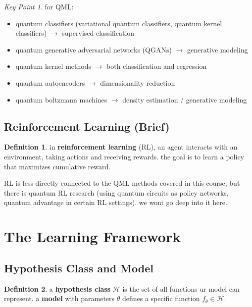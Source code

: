 \documentclass[11pt,a4paper]{article}
\theoremstyle{definition}
\newtheorem{definition}{Definition}[section]
\theoremstyle{remark}
\newtheorem*{keypoint}{Key Point}
\begin{document}
\begin{keypoint}
for QML:
\begin{itemize}
    \item quantum classifiers (variational quantum classifiers, quantum kernel classifiers) $\to$ supervised classification
    \item quantum generative adversarial networks (QGANs) $\to$ generative modeling
    \item quantum kernel methods $\to$ both classification and regression
    \item quantum autoencoders $\to$ dimensionality reduction
    \item quantum boltzmann machines $\to$ density estimation / generative modeling
\end{itemize}
\end{keypoint}

\subsection{Reinforcement Learning (Brief)}

\begin{definition}
in \textbf{reinforcement learning} (RL), an agent interacts with an environment, taking actions and receiving rewards. the goal is to learn a policy that maximizes cumulative reward.
\end{definition}

RL is less directly connected to the QML methods covered in this course, but there is quantum RL research (using quantum circuits as policy networks, quantum advantage in certain RL settings). we wont go deep into it here.

\section{The Learning Framework}

\subsection{Hypothesis Class and Model}

\begin{definition}
a \textbf{hypothesis class} $\mathcal{H}$ is the set of all functions ur model can represent. a \textbf{model} with parameters $\theta$ defines a specific function $f_\theta \in \mathcal{H}$.
\end{definition}
\end{document}
